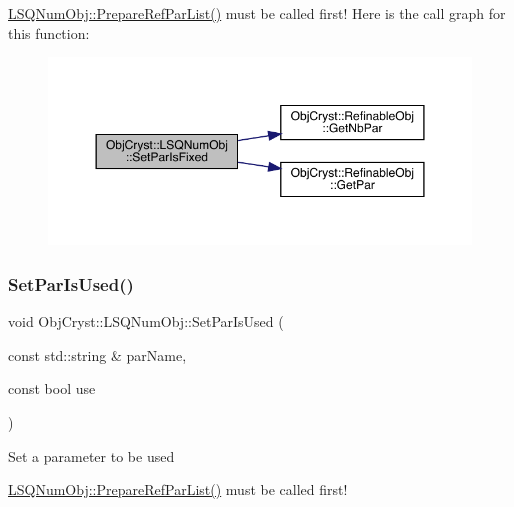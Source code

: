 \mbox{\hyperlink{class_obj_cryst_1_1_l_s_q_num_obj_afdeb58450a3e0506fc02a0b5df15a600}{L\+S\+Q\+Num\+Obj\+::\+Prepare\+Ref\+Par\+List()}} must be called first! Here is the call graph for this function\+:
\nopagebreak
\begin{figure}[H]
\begin{center}
\leavevmode
\includegraphics[width=350pt]{class_obj_cryst_1_1_l_s_q_num_obj_a6fdf2b9d64a527b0c2e81f92fd9be2c3_cgraph}
\end{center}
\end{figure}
\mbox{\label{class_obj_cryst_1_1_l_s_q_num_obj_ab4da8ad96c83cb850145c028e0acb1a7}} 
\subsubsection{\texorpdfstring{SetParIsUsed()}{SetParIsUsed()}\hspace{0.1cm}{\footnotesize\ttfamily [1/2]}}
{\footnotesize\ttfamily void Obj\+Cryst\+::\+L\+S\+Q\+Num\+Obj\+::\+Set\+Par\+Is\+Used (\begin{DoxyParamCaption}\item[{const std\+::string \&}]{par\+Name,  }\item[{const bool}]{use }\end{DoxyParamCaption})}

Set a parameter to be used

\mbox{\hyperlink{class_obj_cryst_1_1_l_s_q_num_obj_afdeb58450a3e0506fc02a0b5df15a600}{L\+S\+Q\+Num\+Obj\+::\+Prepare\+Ref\+Par\+List()}} must be called first! \mbox{\label{class_obj_cryst_1_1_l_s_q_num_obj_a3164f80e5cecec4920aa8fae530a4ebe}} 

